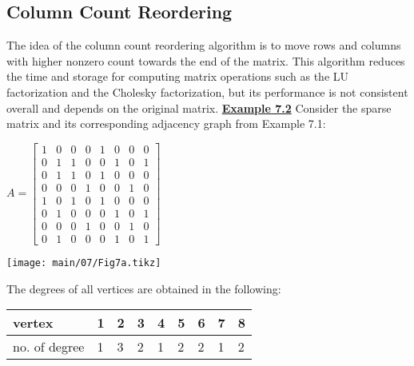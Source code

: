 \subsection{Column Count Reordering}
\vskip 10pt
\noindent
The idea of the column count reordering algorithm is to move rows and columns
with higher nonzero count towards the end of the matrix. This algorithm reduces
the time and storage for computing matrix operations such as the LU
factorization and the Cholesky factorization, but its performance is not
consistent overall and depends on the original matrix.
\vskip 10pt
\noindent
{\bf\underline {Example 7.2}}
\vskip 2pt
\noindent
Consider the sparse matrix and its corresponding adjacency graph from Example
7.1:
\vskip 4pt
\noindent
\begin{table}[H]
  \begin{minipage}[b]{0.50\linewidth}
    \vskip 2pt
    \begin{center}
      $A=
      \begin{bmatrix}
        1 & 0 & 0 & 0 & 1 & 0 & 0 & 0 \\
        0 & 1 & 1 & 0 & 0 & 1 & 0 & 1 \\
        0 & 1 & 1 & 0 & 1 & 0 & 0 & 0 \\
        0 & 0 & 0 & 1 & 0 & 0 & 1 & 0 \\
        1 & 0 & 1 & 0 & 1 & 0 & 0 & 0 \\
        0 & 1 & 0 & 0 & 0 & 1 & 0 & 1 \\
        0 & 0 & 0 & 1 & 0 & 0 & 1 & 0 \\
        0 & 1 & 0 & 0 & 0 & 1 & 0 & 1
      \end{bmatrix}$
    \end{center}
    \vspace{5mm}
  \end{minipage}
  \begin{minipage}[b]{0.49\linewidth}
    \begin{center}
      \texttt{[image: main/07/Fig7a.tikz]}
    \end{center}
  \end{minipage}
\end{table}
\vskip -10pt
The degrees of all vertices are obtained in the following:
\vskip 10pt
\noindent
\begin{center}
  \begin{tabular}{ l | l l l l l l l l }
    vertex          & 1 & 2 & 3 & 4 & 5 & 6 & 7 & 8 \\
    \hline
    no. of degree   & 1 & 3 & 2 & 1 & 2 & 2 & 1 & 2 \\
  \end{tabular}
\end{center}
